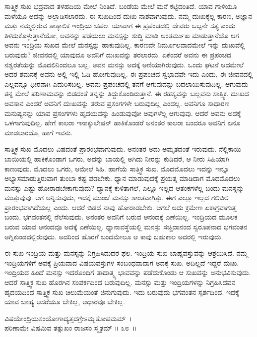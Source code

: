 ಸಾತ್ತ್ವಿಕ ಸುಖ ಭದ್ರವಾದ ತಳಹದಿಯ ಮೇಲೆ ನಿಂತಿದೆ. ಬಂಡೆಯ ಮೇಲೆ ಮನೆ ಕಟ್ಟಿದಂತಿದೆ. ಯಾವ ಗಾಳಿಯೂ ಮಳೆಯೂ ಅದನ್ನು ಅಲ್ಲಾಡಿಸಲಾರದು. ಈ ಸುಖದಿಂದ ದುಃಖ ನಾಶವಾಗುವುದು. ನಮ್ಮ ದುಃಖಕ್ಕೆಲ್ಲ ಕಾರಣ, ಅಜ್ಞಾನ ಮತ್ತು ನಮ್ಮಲ್ಲಿರುವ ತಾತ್ಕಾಲಿಕ ಇಂದ್ರಿಯ ಚಪಲ. ಯಾವಾಗ ಈ ಪ್ರಪಂಚದಲ್ಲಿ ದೇವರು ಒಬ್ಬನೇ ಸತ್ಯ ಎಂದು ತಿಳಿದುಕೊಳ್ಳುತ್ತಾನೆಯೋ, ಅವನನ್ನು ಪಡೆಯಲು ಮನಸ್ಸನ್ನು ಶುದ್ಧಿ ಮಾಡಿ ಅಂತರ್ಮುಖ ಮಾಡುತ್ತಾನೆಯೊ ಆಗ ಅವನು ಇಂದ್ರಿಯ ಸುಖದ ಮೇಲೆ ಮನಸ್ಸನ್ನು ಹಾಕುವುದಿಲ್ಲ. ಕಾರಣವೇ ನಿರ್ಮೂಲವಾದಮೇಲೆ ಇನ್ನು ದುಃಖವೆಲ್ಲಿ ಬರುವುದು? ಜೀವನದಲ್ಲಿ ಯಾವುದೂ ಅವನಿಗೆ ದುಃಖವನ್ನು ತರಲಾರದು. ಏಕೆಂದರೆ ಅವನು ಈ ಪ್ರಪಂಚದ ನಶ್ವರತೆಯನ್ನು ಮೊದಲಿನಿಂದಲೂ ಬಲ್ಲ. ಅವನ ಮನಸ್ಸು ಅದಕ್ಕೆ ಅಣಿಯಾಗಿರುವುದು. ಒಂದು ಘಟನೆ ಆದಮೇಲೆ ಅದರ ಶಮನಕ್ಕೆ ಅವನು ಅಲ್ಲಿ ಇಲ್ಲಿ ಓಡಿ ಹೋಗುವುದಿಲ್ಲ. ಈ ಪ್ರಪಂಚದ ಸ್ವಭಾವವೇ ಇದು ಎಂದು, ಈ ಜೀವನದಲ್ಲಿ ಎಲ್ಲವನ್ನೂ ಧೀರನಾಗಿ ಎದುರಿಸಬಲ್ಲ. ಅವನು ಪ್ರಪಂಚದಲ್ಲಿ ತನಗೆ ಆಗುವುದನ್ನು ಬದಲಾಯಿಸುವುದಿಲ್ಲ. ಆಗುವುದು ತನ್ನ ಮೇಲೆ ಪರಿಣಾಮವನ್ನು ಬಿಡದಂತೆ ತನ್ನನ್ನು ತಿದ್ದುಕೊಂಡಿರುತ್ತಾನೆ. ಈ ರಹಸ್ಯವನ್ನು ಬಲ್ಲವನು ಸಾತ್ತ್ವಿಕ. ದುಃಖದ ಅವಸಾನ ಎಂದರೆ ಅವನಿಗೆ ದುಃಖವನ್ನು ತರುವ ಪ್ರಸಂಗಗಳೇ ಬರುವುದಿಲ್ಲ ಎಂದಲ್ಲ. ಅವನಿಗೂ ಸಾಧಾರಣ ಮನುಷ್ಯನನ್ನು ಯಾವ ಪ್ರಸಂಗಗಳು ಹೃದಯವನ್ನು ಹಿಂಡುವುವೋ ಅವುಗಳೆಲ್ಲ ಆಗುವುವು. ಆದರೆ ಅವನು ಅದಕ್ಕೆ ಒಳಗಾಗುವುದಿಲ್ಲ. ಹೇಗೆ ಕಾಲರಾ ಇನಾಕ್ಯುಲೇಷನ್ ಹಾಕಿಕೊಂಡರೆ ಅನಂತರ ಕಾಲರಾ ಬಂದರೂ ಅವನಿಗೆ ಏನೂ ಮಾಡಲಾರದೊ, ಹಾಗೆ ಇವನು.

ಸಾತ್ತ್ವಿಕ ಸುಖ ಮೊದಲು ವಿಷದಂತೆ ಪ್ರಾರಂಭವಾಗುವುದು. ಅನಂತರ ಅದು ಅಮೃತದಂತೆ ಇರುವುದು. ನೆಲ್ಲಿಕಾಯಿ ಬಾಯಿಯಲ್ಲಿ ಹಾಕಿಕೊಂಡಾಗ ಒಗರು, ಅದನ್ನು ಬಾಯಲ್ಲಿ ಅಗಿದು ನೀರನ್ನು ಕುಡಿದರೆ, ಆ ನೀರು ಸಿಹಿಯಾಗಿ ಕಾಣುವುದು. ಮೊದಲು ಒಗರು, ಆಮೇಲೆ ಸಿಹಿ. ಹಾಗೆಯೆ ಸಾತ್ತ್ವಿಕ ಸುಖ. ಮೊದಮೊದಲು ಇದನ್ನು ಇನ್ನೂ ಅಭ್ಯಾಸಮಾಡುತ್ತಿರುವಾಗ ತುಂಬಾ ಕಷ್ಟ ಪಡಬೇಕು. ಧ್ಯಾನ ಮಾಡುವುದಕ್ಕೆ ಪ್ರಯತ್ನ ಮಾಡಿದಾಗ ಮೊದಮೊದಲು ಮನಸ್ಸು ಎಷ್ಟು ಹೋರಾಡಬೇಕಾಗುವುದು? ಧ್ಯಾನಕ್ಕೆ ಕುಳಿತಾಗಲೆ, ಎಲ್ಲೂ ಇಲ್ಲದ ಆತಂಕಗಳೆಲ್ಲ ಬಂದು ಮನಸ್ಸನ್ನು ಮುತ್ತುವುವು. ಆಗ ಅನ್ನಿಸುವುದು, ಇದಕ್ಕೆ ಮುಂಚೆ ಮನಸ್ಸು ಶಾಂತವಾಗಿತ್ತು. ಈಗ ಎಲ್ಲೂ ಇಲ್ಲದ ಗಲಿಬಿಲಿ ಪ್ರಾರಂಭವಾಗಿದೆಯಲ್ಲ ಎಂದು. ಆದರೆ ಬಿಡದೆ ನಾವು ಹೋರಾಡಬೇಕು. ಆಗಲೆ ಅದು ಕ್ರಮೇಣ ಏಕಾಗ್ರವಾಗುತ್ತ ಬಂದು, ಭಗವಂತನಲ್ಲಿ ನೆಲೆಸುವುದು. ಅನಂತರ ಅವನಿಗೆ ಬರುವ ಆನಂದಕ್ಕೆ ಎಣೆಯಿಲ್ಲ. ಇಂದ್ರಿಯದ ಮೂಲಕ ಬರುವ ಯಾವ ಆನಂದವೂ ಅದಕ್ಕೆ ಎಣೆಯಿಲ್ಲ. ಧ್ಯಾನಾವಸ್ಥೆಯಲ್ಲಿ ಮನಸ್ಸು ಸಚ್ಚಿದಾನಂದ ಸ್ವರೂಪನಾದ ಭಗವಂತನ ಅಗ್ನಿಕುಂಡದಲ್ಲಿರುವುದು. ಅದರಿಂದ ಹೊರಗೆ ಬಂದಮೇಲೂ ಆ ಕಾವು ಬಹುಕಾಲ ಅದರಲ್ಲಿ ಇರುವುದು.

ಈ ಸುಖ ಇಂದ್ರಿಯ ಮತ್ತು ಮನಸ್ಸನ್ನು ನಿಗ್ರಹಿಸಿದುದರ ಫಲ. ಇಂದ್ರಿಯ ಸುಖ ಬಾಹ್ಯವಸ್ತುವನ್ನು ಆಶ್ರಯಿಸಿದೆ. ನಮ್ಮ ಇಂದ್ರಿಯಗಳಿಗೆ ಅವಕ್ಕೆ ಪ್ರಿಯವಾದ ವಿಷಯವಸ್ತುಗಳ ಸಂಬಂಧವಾದಾಗ ಅದಕ್ಕೆ ಸುಖ. ಅದಿಲ್ಲದೆ ಇದ್ದರೆ ದುಃಖ. ಇಂದ್ರಿಯದ ಹಿಂದೆ ಮನಸ್ಸು ಇದರೊಂದಿಗೆ ತಾದಾತ್ಮ್ಯ ಭಾವವನ್ನು ಪಡೆದುಕೊಂಡು ಆ ಸುಖವನ್ನು ಅನುಭವಿಸುವುದು. ಆದರೆ ಸಾತ್ತ್ವಿಕ ಸುಖ ಹೊರಗಿನ ಸಂಪರ್ಕದಿಂದ ಬರುವುದಿಲ್ಲ. ಮನಸ್ಸು ಮತ್ತು ಇಂದ್ರಿಯಗಳನ್ನು ನಿಗ್ರಹಿಸಿದವನ ಹೃದಯದಿಂದ ಸಾತ್ತ್ವಿಕ ಸುಖ ಚಿಲುಮೆಯಂತೆ ಜಿನುಗುವುದು. ಇದು ಬರುವುದು ಭಗವಂತನ ಸ್ಪರ್ಶದಿಂದ. ಇದಕ್ಕೆ ಯಾವ ಬಾಹ್ಯ ಆಸರೆಯೂ ಬೇಕಿಲ್ಲ, ಆಧಾರವೂ ಬೇಕಿಲ್ಲ.

\begin{shloka}
ವಿಷಯೇಂದ್ರಿಯಸಂಯೋಗಾದ್ಯತ್ತದಗ್ರೇಽಮೃತೋಪಮಮ್~।\\ಪರಿಣಾಮೇ ವಿಷಮಿವ ತತ್ಸುಖಂ ರಾಜಸಂ ಸ್ಮೃತಮ್ \hfill॥ ೩೮~॥
\end{shloka}

